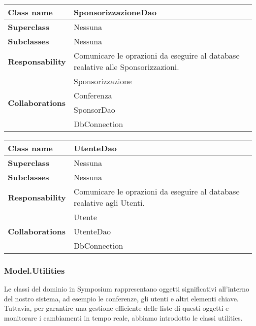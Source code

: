 \begin{table}[h!]
	\begin{tabular}{|l|l|}
		\hline 
		\textbf{Class name} & SponsorizzazioneDao
		\\ \hline
		\textbf{Superclass} & Nessuna
		\\ \hline
		\multirow{1}{*}{\textbf{Subclasses}} & Nessuna
		\\ \hline
		\textbf{Responsability} & Comunicare le oprazioni da eseguire al database realative alle Sponsorizzazioni.
		\\ \hline
		\multirow{4}{*}{\textbf{Collaborations}} & Sponsorizzazione \\ 
		& Conferenza \\
		& SponsorDao \\
		& DbConnection \\ \hline
	\end{tabular}
\end{table}

\begin{table}[h!]
	\begin{tabular}{|l|l|}
		\hline 
		\textbf{Class name} & UtenteDao
		\\ \hline
		\textbf{Superclass} & Nessuna
		\\ \hline
		\multirow{1}{*}{\textbf{Subclasses}} & Nessuna
		\\ \hline
		\textbf{Responsability} & Comunicare le oprazioni da eseguire al database realative agli Utenti.
		\\ \hline
		\multirow{3}{*}{\textbf{Collaborations}} & Utente \\ 
		& UtenteDao \\
		& DbConnection \\ \hline
	\end{tabular}
\end{table}

\subsubsection{Model.Utilities}
Le classi del dominio in Symposium rappresentano oggetti significativi all'interno del nostro sistema, ad esempio le conferenze, gli utenti e altri elementi chiave. Tuttavia, per garantire una gestione efficiente delle liste di questi oggetti e monitorare i cambiamenti in tempo reale, abbiamo introdotto le classi utilities.
\bigskip

